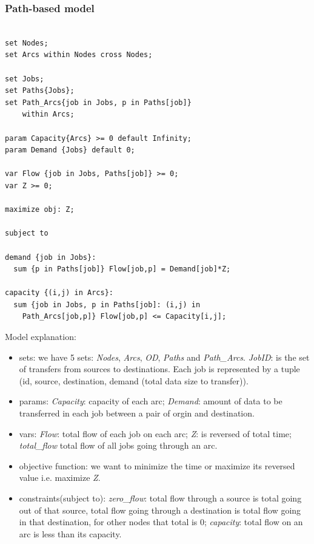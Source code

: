 \subsubsection{Path-based model}

\begingroup
\fontsize{9pt}{10pt}\selectfont

\begin{verbatim}

set Nodes;
set Arcs within Nodes cross Nodes;

set Jobs;
set Paths{Jobs};
set Path_Arcs{job in Jobs, p in Paths[job]} 
    within Arcs;

param Capacity{Arcs} >= 0 default Infinity;
param Demand {Jobs} default 0;

var Flow {job in Jobs, Paths[job]} >= 0;
var Z >= 0;

maximize obj: Z;

subject to

demand {job in Jobs}:
  sum {p in Paths[job]} Flow[job,p] = Demand[job]*Z;

capacity {(i,j) in Arcs}:
  sum {job in Jobs, p in Paths[job]: (i,j) in 
    Path_Arcs[job,p]} Flow[job,p] <= Capacity[i,j];

\end{verbatim}

\endgroup

Model explanation:
\begin{itemize}
\item sets: we have 5 sets: \textit{Nodes}, \textit{Arcs}, \textit{OD}, \textit{Paths} and \textit{Path\_Arcs}. \textit{JobID}: is the set of transfers from sources to destinations. Each job is represented by a tuple (id, source, destination, demand (total data size to transfer)).
\item params: {\it Capacity}: capacity of each arc; {\it Demand}: amount of data to be transferred in each job between a pair of orgin and destination.
\item vars: \textit{Flow}: total flow of each job on each arc; \textit{Z}: is reversed of total time; \textit{total\_flow} total flow of all jobs going through an arc.
\item objective function: we want to minimize the time or maximize its reversed value i.e. maximize \textit{Z}.
\item constraints(subject to): \textit{zero\_flow}: total flow through a source is total going out of that source, total flow going through a destination is total flow going in that destination, for other nodes that total is 0; \textit{capacity}: total flow on an arc is less than its capacity.
\end{itemize}

